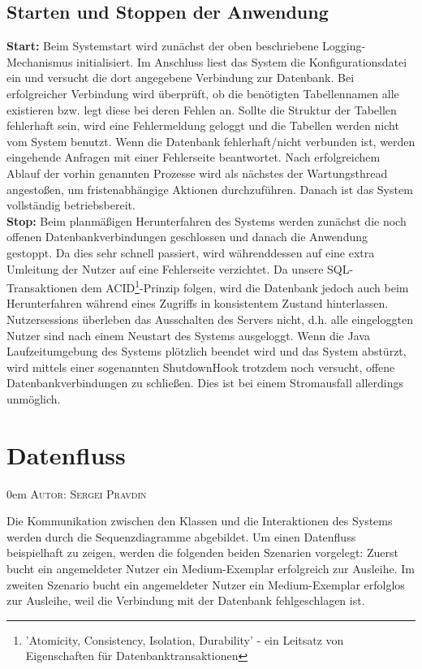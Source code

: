 \documentclass{article}
\makeatletter
\newcommand{\sectionauthor}[1]{
	{\parindent 0em \large \scshape Autor: #1 \par \nobreak \vspace*{1em}}
	\@afterheading
}
\makeatother
\begin{document}
\subsection{Starten und Stoppen der Anwendung}
\noindent \textbf{Start:} Beim Systemstart wird zunächst der oben beschriebene Logging-Mechanismus initialisiert. Im Anschluss liest das System die Konfigurationsdatei ein und versucht die dort angegebene Verbindung zur Datenbank. Bei erfolgreicher Verbindung wird überprüft, ob die benötigten Tabellennamen alle existieren bzw. legt diese bei deren Fehlen an. Sollte die Struktur der Tabellen fehlerhaft sein, wird eine Fehlermeldung geloggt und die Tabellen werden nicht vom System benutzt. Wenn die Datenbank fehlerhaft/nicht verbunden ist, werden eingehende Anfragen mit einer Fehlerseite beantwortet. Nach erfolgreichem Ablauf der vorhin genannten Prozesse wird als nächstes der Wartungsthread angestoßen, um fristenabhängige Aktionen durchzuführen. Danach ist das System vollständig betriebsbereit.\\
\textbf{Stop:}
Beim planmäßigen Herunterfahren des Systems werden zunächst die noch offenen Datenbankverbindungen geschlossen und danach die Anwendung gestoppt. Da dies sehr schnell passiert, wird währenddessen auf eine extra Umleitung der Nutzer auf eine Fehlerseite verzichtet. Da unsere SQL-Transaktionen dem ACID\footnote{'Atomicity, Consistency, Isolation, Durability' - ein Leitsatz von Eigenschaften für Datenbanktransaktionen}-Prinzip folgen, wird die Datenbank jedoch auch beim Herunterfahren während eines Zugriffs in konsistentem Zustand hinterlassen. Nutzersessions überleben das Ausschalten des Servers nicht, d.h. alle eingeloggten Nutzer sind nach einem Neustart des Systems ausgeloggt. Wenn die Java Laufzeitumgebung des Systems plötzlich beendet wird und das System abstürzt, wird mittels einer sogenannten ShutdownHook trotzdem noch versucht, offene Datenbankverbindungen zu schließen. Dies ist bei einem Stromausfall allerdings unmöglich.
\section{Datenfluss}
\sectionauthor{Sergei Pravdin}
Die Kommunikation zwischen den Klassen und die Interaktionen des Systems werden durch die Sequenzdiagramme abgebildet. Um einen Datenfluss beispielhaft zu zeigen, werden die folgenden beiden Szenarien vorgelegt: Zuerst bucht ein angemeldeter Nutzer ein Medium-Exemplar erfolgreich zur Ausleihe. Im zweiten Szenario bucht ein angemeldeter Nutzer ein Medium-Exemplar erfolglos zur Ausleihe, weil die Verbindung mit der Datenbank fehlgeschlagen ist.
\end{document}
